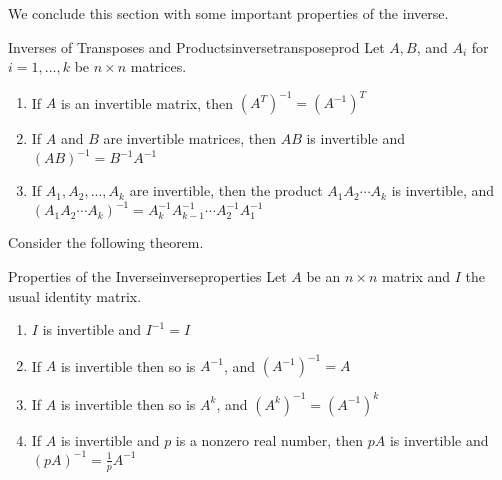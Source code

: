 We conclude this section with some important properties of the inverse. 

\begin{theorem}{Inverses of Transposes and Products}{inversetransposeprod}
Let $A, B$, and $A_i$ for $i=1,...,k$ be $n \times n$ matrices. 
\begin{enumerate}
\item
If $A$ is an invertible matrix, then $(A^{T})^{-1} = (A^{-1})^{T}$
\item
If $A$ and $B$ are invertible matrices, then $AB$ is invertible and $(AB)^{-1} = B^{-1}A^{-1}$
\item
If $A_1, A_2, ..., A_k$ are invertible, then the product $A_1A_2 \cdots A_k$ is invertible, and $(A_1A_2 \cdots A_k)^{-1} = A_k^{-1}A_{k-1}^{-1} \cdots A_2^{-1}A_1^{-1}$
\end{enumerate}
\end{theorem}

Consider the following theorem.

\begin{theorem}{Properties of the Inverse}{inverseproperties}
Let $A$ be an $n \times n$ matrix and $I$ the usual identity matrix. 
\begin{enumerate}
\item
$I$ is invertible and $I^{-1} = I$
\item
If $A$ is invertible then so is $A^{-1}$, and $(A^{-1})^{-1} = A$
\item
If $A$ is invertible then so is $A^k$, and $(A^k)^{-1} = (A^{-1})^k$
\item
If $A$ is invertible and $p$ is a nonzero real number, then $pA$ is invertible and $(pA)^{-1} = \frac{1}{p}A^{-1}$
\end{enumerate}
\end{theorem}
